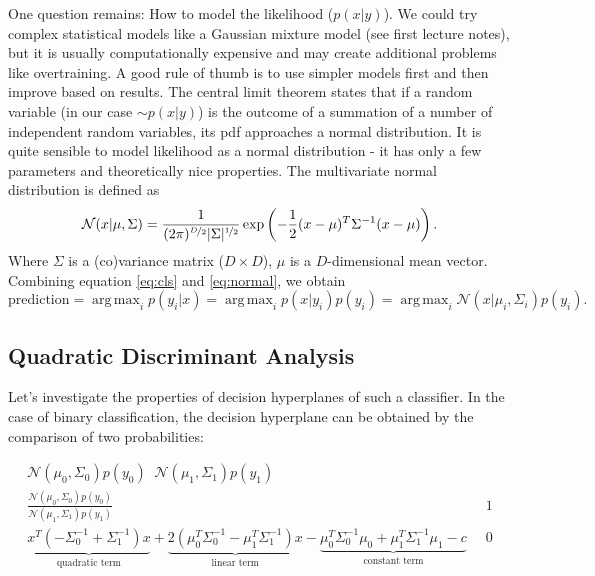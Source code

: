 \documentclass{article}
\DeclareMathOperator*{\argmax}{arg\,max}
\DeclareMathOperator*{\equnk}{\overset{?}<}
\begin{document}
One question remains: How to model the likelihood ($p(x|y)$). 
We could try complex statistical models like a Gaussian mixture model (see first lecture notes), but it is usually computationally
expensive and may create additional problems like overtraining. 
A good rule of thumb is to use simpler models first and then improve based on results.
The central limit theorem states that if a random variable (in our case $\sim p(x|y)$) 
is the outcome of a summation of a number of independent random variables, its pdf approaches a normal distribution. 
It is quite sensible to model likelihood as a normal distribution - 
it has only a few parameters and theoretically nice properties. 
The multivariate normal distribution is defined as
\begin{equation}
    \label{eq:normal}
    \mathcal{N}(x | \mu, \Sigma) = \frac{1}{
    (2\pi)^{\nicefrac{D}{2}} |\Sigma|^{\nicefrac{1}{2}}} 
    \exp\left(
        -\frac{1}{2}(x - \mu)^T\Sigma^{-1}(x-\mu)
    \right).
\end{equation}
Where $\Sigma$ is a (co)variance matrix ($D\times D$), $\mu$ is a $D$-dimensional mean vector. 
Combining equation \ref{eq:cls} and \ref{eq:normal}, we obtain
\begin{equation}
    \text{prediction} = \argmax_i p(y_i | x) = \argmax_i p(x|y_i) p(y_i) = \argmax_i \mathcal{N}(x|\mu_i, \Sigma_i)  p(y_i).
\end{equation}


\subsection{Quadratic Discriminant Analysis}
Let’s investigate the properties of decision hyperplanes of such a classifier.
In the case of binary classification, the decision hyperplane can be obtained by 
the comparison of two probabilities: 

\begingroup
\allowdisplaybreaks
\begin{align}
    \mathcal{N}(\mu_0, \Sigma_0)  p(y_0) \equnk
    \mathcal{N}(\mu_1, \Sigma_1)  p(y_1) \\
    \frac{
        \mathcal{N}(\mu_0, \Sigma_0)  p(y_0) 
    }{
        \mathcal{N}(\mu_1, \Sigma_1)  p(y_1) 
    } &\equnk 1 \\
        \label{eq:reduce_linear}
        \underbrace{
            x^T \left(
            -\Sigma_0^{-1} + \Sigma_1^{-1}
        \right) x }_{\text{quadratic term}}
        + 
        \underbrace{
        2\left(\mu_0^T\Sigma_0^{-1} - \mu_1^T\Sigma_1^{-1}\right)x}_{\text{linear term}}
        -\underbrace{
         \mu_0^T\Sigma_0^{-1}\mu_0
    + \mu_1^T\Sigma_1^{-1}\mu_1 - c}_{\text{constant term}}
    &\equnk 0
\end{align}
\endgroup
\end{document}
